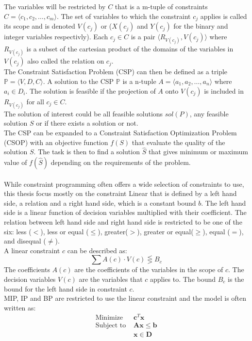 The variables will be restricted by $C$ that is a m-tuple of constraints $C= \langle 
c_1,c_2, \dots , c_m \rangle $. The set of variables to which the constraint $c_j$ applies is called its scope and 
is denoted $V(c_j)$ or ($X(c_j)$ and $Y(c_j)$ for the binary and integer variables respectivly). Each $c_j \in C$ is a 
pair $\langle R_{V(c_j)}, V(c_j) \rangle $ where $ R_{V(c_j)}$ is a subset of the 
cartesian product of the domains of the variables in $V(c_j)$ also called the relation on $c_j$. \\ 
The Constraint Satisfaction Problem (CSP) can then be defined as a triple $\mathbb{P} = \langle V,D,C \rangle$. A 
solution to the CSP $\mathbb{P}$ is a n-tuple $A = \langle a_1,a_2,\dots,a_n\rangle $ where $a_i \in 
D_i$. The solution is feasible if the projection of $A$ onto $V(c_j)$ is included in $R_{V(c_j)}$ for all 
$c_j \in C$.\\ 
The solution of interest could be all feasible solutions $sol(P)$, any feasible solution $S$ or if there 
exists a solution or not. \\ 
The CSP can be expanded to a Constraint Satisfaction Optimization Problem (CSOP) with an objective function $f(S)$ 
that evaluate the quality of the solution $S$. The task is then to find a solution $\hat{S}$ that gives minimum or 
maximum value of $f(\hat{S})$ depending on the requirements of the problem. \\ \\ 
While constraint programming often offers a wide selection of constraints to use, this thesis focus mostly on the 
constraint Linear that is defined by a left hand side, a relation and a 
right hand side, which is a constant bound $b$. The left hand side is a linear function of decision variables 
multiplied with their coefficient. The relation between left hand side and right hand side is restricted to be one of 
the six: less ($<$), less or equal ($\leq$), greater($>$), greater or equal($\geq$), equal ($=$), and disequal 
($\neq$). \\ 
A linear constraint $c$ can be described as: 
\begin{equation}
 \sum A(c) \cdot V(c) \lesseqgtr B_c
\end{equation}
The coefficients $A(c)$ are the coefficients of the variables in the scope of $c$. The decision variables $V(c)$ are 
the variables that $c$ applies to. The bound $B_c$ is the bound for the left hand side in constraint $c$. \\ 
MIP, IP and BP are restricted to use the linear constraint and the model is often written as: 
\begin{align}
 \text{Minimize } & \mathbf{c}^T\mathbf{x} \nonumber \\ 
 \text{Subject to } &\mathbf{Ax} \leq \mathbf{b} \nonumber\\
 &\mathbf{x} \in \mathbf{D}
\end{align}





